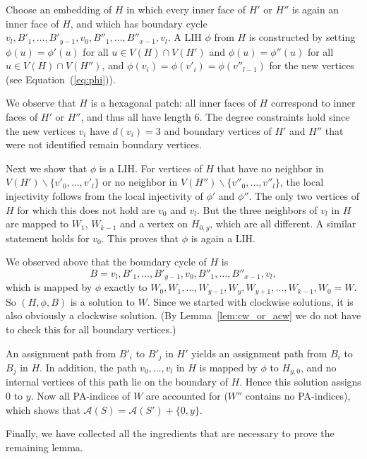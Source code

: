 \documentclass{llncs}
\newcommand{\bs}{\backslash}
\newcommand{\QED}{\hspace*{\fill}{$\Box$}\medskip}
\newcommand{\AS}{\mathcal{A}}
\newcommand{\Bo}{B'}
\newcommand{\Bt}{B''}
\begin{document}
Choose an embedding of $H$ in which every inner face of $H'$ or $H''$ is again an inner face of $H$, and which has boundary cycle $v_l,\Bo_{1},\ldots,\Bo_{y-1},v_0,\Bt_{1},\ldots,\Bt_{x-1},v_l$.
A LIH $\phi$ from $H$ is constructed by setting $\phi(u)=\phi'(u)$ for all $u\in V(H)\cap V(H')$ and $\phi(u)=\phi''(u)$ for all $u\in V(H)\cap V(H'')$, and $\phi(v_i)=\phi(v'_i)=\phi(v''_{l-1})$ for the new vertices (see Equation~(\ref{eq:phi})).




We observe that $H$ is a hexagonal patch: 
all inner faces of $H$ correspond to inner faces of $H'$ or $H''$, and thus all have length 6. The degree constraints hold since the new vertices $v_i$ have $d(v_i)=3$ and boundary vertices of $H'$ and $H''$ that were not identified remain boundary vertices.



Next we show that $\phi$ is a LIH. For vertices of $H$ that have no neighbor in $V(H')\bs\{v'_0,\ldots,v'_l\}$ or no neighbor in $V(H'')\bs \{v''_0,\ldots,v''_l\}$, the local injectivity follows from the local injectivity of $\phi'$ and $\phi''$. 
The only two vertices of $H$ for which this does not hold are $v_0$ and $v_l$. But the three neighbors of $v_l$ in $H$ are mapped to $W_1$, $W_{k-1}$ and a vertex on $H_{0,y}$, which are all different. A similar statement holds for $v_0$. This proves that $\phi$ is again a LIH.


 
We observed above that the boundary cycle of $H$ is 
\[
B=v_l,\Bo_{1},\ldots,\Bo_{y-1},v_0,\Bt_{1},\ldots,\Bt_{x-1},v_l,
\] 
which is mapped by $\phi$ exactly to $W_0,W_{1},\ldots,W_{y-1},W_y,W_{y+1},\ldots,W_{k-1},W_0=W$. 
So $(H,\phi,B)$ is a solution to $W$. Since we started with clockwise solutions, it is also obviously a clockwise solution.
(By Lemma~\ref{lem:cw_or_acw} we do not have to check this for all boundary vertices.)



	
An assignment path from $\Bo_i$ to $\Bo_j$ in $H'$ yields an assignment path from $B_{i}$ to $B_{j}$ in $H$.
In addition, the path $v_0,\ldots,v_l$ in $H$ is mapped by $\phi$ to $H_{y,0}$, and no internal vertices of this path lie on the boundary of $H$. Hence this solution assigns $0$ to $y$. Now all PA-indices of $W$ are accounted for ($W''$ contains no PA-indices), which shows that 
$\AS(S)=\AS(S')+\{0,y\}$.
\QED






Finally, we have collected all the ingredients that are necessary to prove the remaining lemma.
\end{document}
